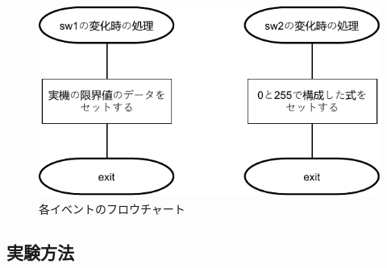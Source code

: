 \documentclass{jarticle}
\begin{document}
\begin{figure}[H]
    \centering
    \includegraphics{kumikomi6-swChenged.pdf}
    \caption{各イベントのフロウチャート}
    \label{fig:my_label}
\end{figure}


\subsection{実験方法}
\end{document}
